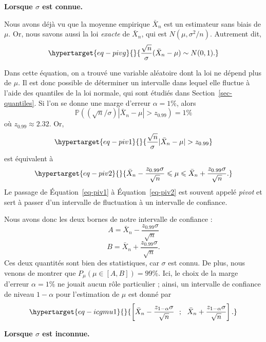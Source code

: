 \documentclass[
  10,
  letterpaper,
  DIV=11,
  numbers=noendperiod]{scrreport}
\theoremstyle{plain}
\theoremstyle{definition}
\theoremstyle{plain}
\theoremstyle{definition}
\theoremstyle{definition}
\theoremstyle{plain}
\theoremstyle{remark}
\begin{document}
\textbf{Lorsque \(\sigma\) est connue. }

Nous avons déjà vu que la moyenne empirique \(\bar{X}_n\) est un
estimateur sans biais de \(\mu\). Or, nous savons aussi la loi
\emph{exacte} de \(\bar{X}_n\), qui est \(N(\mu, \sigma^2/n)\).
Autrement dit,
\begin{equation}\protect\hypertarget{eq-pivg}{}{\frac{\sqrt{n}}{\sigma}(\bar{X}_n - \mu) \sim N(0,1).}\label{eq-pivg}\end{equation}

Dans cette équation, on a trouvé une variable aléatoire dont la loi ne
dépend plus de \(\mu\). Il est donc possible de déterminer un intervalle
dans lequel elle fluctue à l'aide des quantiles de la loi normale, qui
sont étudiés dans Section~\ref{sec-quantiles}. Si l'on se donne une
marge d'erreur \(\alpha = 1\%\), alors
\[ \mathbb{P}( (\sqrt{n}/\sigma)|\bar{X}_n - \mu| > z_{0.99}) = 1\%\] où
\(z_{0.99} \approx 2.32\). Or,
\begin{equation}\protect\hypertarget{eq-piv1}{}{ \frac{\sqrt{n}}{\sigma}|\bar{X}_n - \mu| > z_{0.99}}\label{eq-piv1}\end{equation}
est équivalent à
\begin{equation}\protect\hypertarget{eq-piv2}{}{ \bar{X}_n - \frac{z_{0.99}\sigma}{\sqrt{n}} \leqslant \mu \leqslant \bar{X}_n + \frac{z_{0.99}\sigma}{\sqrt{n}}.}\label{eq-piv2}\end{equation}
Le passage de Équation~\ref{eq-piv1} à Équation~\ref{eq-piv2} est
souvent appelé \emph{pivot} et sert à passer d'un intervalle de
fluctuation à un intervalle de confiance.

Nous avons donc les deux bornes de notre intervalle de confiance :
\[ A = \bar{X}_n - \frac{z_{0.99}\sigma}{\sqrt{n}}\]
\[ B = \bar{X}_n + \frac{z_{0.99}\sigma}{\sqrt{n}} .\] Ces deux
quantités sont bien des statistiques, car \(\sigma\) est connu. De plus,
nous venons de montrer que \(P_\mu(\mu \in [A,B]) = 99\%\). Ici, le
choix de la marge d'erreur \(\alpha = 1\%\) ne jouait aucun rôle
particulier ; ainsi, un intervalle de confiance de niveau \(1-\alpha\)
pour l'estimation de \(\mu\) est donné par
\begin{equation}\protect\hypertarget{eq-icgmu1}{}{\left[\bar{X}_n - \frac{z_{1-\alpha}\sigma}{\sqrt{n}}~~;~~\bar{X}_n + \frac{z_{1-\alpha}\sigma}{\sqrt{n}} \right].}\label{eq-icgmu1}\end{equation}

\textbf{Lorsque \(\sigma\) est inconnue. }
\end{document}
